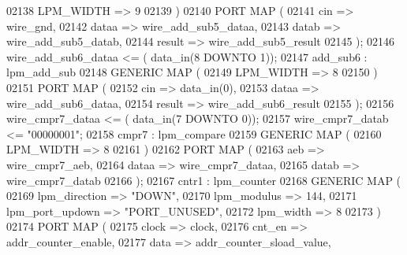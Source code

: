 \begin{DoxyCode}
{02138         LPM\_WIDTH => \textcolor{vhdllogic}{9}
02139       \textcolor{vhdlchar}{)}
02140       \textcolor{keywordflow}{PORT} \textcolor{keywordflow}{MAP} ( 
02141         cin => wire_gnd,
02142         dataa => wire_add_sub5_dataa,
02143         datab => wire_add_sub5_datab,
02144         result => wire_add_sub5_result
02145       \textcolor{vhdlchar}{)};
02146     \textcolor{vhdlchar}{wire_add_sub6_dataa} \textcolor{vhdlchar}{<=} \textcolor{vhdlchar}{(} \textcolor{vhdlchar}{data_in}\textcolor{vhdlchar}{(}\textcolor{vhdllogic}{}\textcolor{vhdllogic}{8} \textcolor{keywordflow}{DOWNTO} \textcolor{vhdllogic}{}\textcolor{vhdllogic}{1}\textcolor{vhdlchar}{)}\textcolor{vhdlchar}{)};
02147     add_sub6 :  lpm\_add\_sub
02148       \textcolor{keywordflow}{GENERIC} \textcolor{keywordflow}{MAP} (
02149         LPM\_WIDTH => \textcolor{vhdllogic}{8}
02150       \textcolor{vhdlchar}{)}
02151       \textcolor{keywordflow}{PORT} \textcolor{keywordflow}{MAP} ( 
02152         cin => data_in\textcolor{vhdlchar}{(}\textcolor{vhdllogic}{0}\textcolor{vhdlchar}{)},
02153         dataa => wire_add_sub6_dataa,
02154         result => wire_add_sub6_result
02155       \textcolor{vhdlchar}{)};
02156     \textcolor{vhdlchar}{wire_cmpr7_dataa} \textcolor{vhdlchar}{<=} \textcolor{vhdlchar}{(} \textcolor{vhdlchar}{data_in}\textcolor{vhdlchar}{(}\textcolor{vhdllogic}{}\textcolor{vhdllogic}{7} \textcolor{keywordflow}{DOWNTO} \textcolor{vhdllogic}{}\textcolor{vhdllogic}{0}\textcolor{vhdlchar}{)}\textcolor{vhdlchar}{)};
02157     \textcolor{vhdlchar}{wire_cmpr7_datab} \textcolor{vhdlchar}{<=} \textcolor{vhdllogic}{"00000001"};
02158     cmpr7 :  lpm\_compare
02159       \textcolor{keywordflow}{GENERIC} \textcolor{keywordflow}{MAP} (
02160         LPM\_WIDTH => \textcolor{vhdllogic}{8}
02161       \textcolor{vhdlchar}{)}
02162       \textcolor{keywordflow}{PORT} \textcolor{keywordflow}{MAP} ( 
02163         aeb => wire_cmpr7_aeb,
02164         dataa => wire_cmpr7_dataa,
02165         datab => wire_cmpr7_datab
02166       \textcolor{vhdlchar}{)};
02167     cntr1 :  lpm\_counter
02168       \textcolor{keywordflow}{GENERIC} \textcolor{keywordflow}{MAP} (
02169         lpm\_direction => \textcolor{keyword}{"DOWN"},
02170         lpm\_modulus => \textcolor{vhdllogic}{144},
02171         lpm\_port\_updown => \textcolor{keyword}{"PORT\_UNUSED"},
02172         lpm\_width => \textcolor{vhdllogic}{8}
02173       \textcolor{vhdlchar}{)}
02174       \textcolor{keywordflow}{PORT} \textcolor{keywordflow}{MAP} ( 
02175         clock => clock,
02176         cnt\_en => addr_counter_enable,
02177         data => addr_counter_sload_value,
}
\end{DoxyCode}

